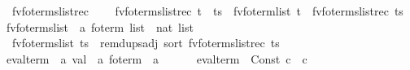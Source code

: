 \begin{isabellebody}
\ \ {\isachardoublequoteopen}fv{\isacharunderscore}{\kern0pt}fo{\isacharunderscore}{\kern0pt}terms{\isacharunderscore}{\kern0pt}list{\isacharunderscore}{\kern0pt}rec\ {\isacharbrackleft}{\kern0pt}{\isacharbrackright}{\kern0pt}\ {\isacharequal}{\kern0pt}\ {\isacharbrackleft}{\kern0pt}{\isacharbrackright}{\kern0pt}{\isachardoublequoteclose}\isanewline
{\isacharbar}{\kern0pt}\ {\isachardoublequoteopen}fv{\isacharunderscore}{\kern0pt}fo{\isacharunderscore}{\kern0pt}terms{\isacharunderscore}{\kern0pt}list{\isacharunderscore}{\kern0pt}rec\ {\isacharparenleft}{\kern0pt}t\ {\isacharhash}{\kern0pt}\ ts{\isacharparenright}{\kern0pt}\ {\isacharequal}{\kern0pt}\ fv{\isacharunderscore}{\kern0pt}fo{\isacharunderscore}{\kern0pt}term{\isacharunderscore}{\kern0pt}list\ t\ {\isacharat}{\kern0pt}\ fv{\isacharunderscore}{\kern0pt}fo{\isacharunderscore}{\kern0pt}terms{\isacharunderscore}{\kern0pt}list{\isacharunderscore}{\kern0pt}rec\ ts{\isachardoublequoteclose}\isanewline
\isanewline
{}\isamarkupfalse%
\ fv{\isacharunderscore}{\kern0pt}fo{\isacharunderscore}{\kern0pt}terms{\isacharunderscore}{\kern0pt}list\ {\isacharcolon}{\kern0pt}{\isacharcolon}{\kern0pt}\ {\isachardoublequoteopen}{\isacharparenleft}{\kern0pt}{\isacharprime}{\kern0pt}a\ fo{\isacharunderscore}{\kern0pt}term{\isacharparenright}{\kern0pt}\ list\ {\isasymRightarrow}\ nat\ list{\isachardoublequoteclose}\ \isanewline
\ \ {\isachardoublequoteopen}fv{\isacharunderscore}{\kern0pt}fo{\isacharunderscore}{\kern0pt}terms{\isacharunderscore}{\kern0pt}list\ ts\ {\isacharequal}{\kern0pt}\ remdups{\isacharunderscore}{\kern0pt}adj\ {\isacharparenleft}{\kern0pt}sort\ {\isacharparenleft}{\kern0pt}fv{\isacharunderscore}{\kern0pt}fo{\isacharunderscore}{\kern0pt}terms{\isacharunderscore}{\kern0pt}list{\isacharunderscore}{\kern0pt}rec\ ts{\isacharparenright}{\kern0pt}{\isacharparenright}{\kern0pt}{\isachardoublequoteclose}\isanewline
\isanewline
{}\isamarkupfalse%
\ eval{\isacharunderscore}{\kern0pt}term\ {\isacharcolon}{\kern0pt}{\isacharcolon}{\kern0pt}\ {\isachardoublequoteopen}{\isacharprime}{\kern0pt}a\ val\ {\isasymRightarrow}\ {\isacharprime}{\kern0pt}a\ fo{\isacharunderscore}{\kern0pt}term\ {\isasymRightarrow}\ {\isacharprime}{\kern0pt}a{\isachardoublequoteclose}\ {\isacharparenleft}{\kern0pt}\ {\isachardoublequoteopen}{\isasymcdot}{\isachardoublequoteclose}\ {}{}{\isacharparenright}{\kern0pt}\ \isanewline
\ \ {\isachardoublequoteopen}eval{\isacharunderscore}{\kern0pt}term\ {\isasymsigma}\ {\isacharparenleft}{\kern0pt}Const\ c{\isacharparenright}{\kern0pt}\ {\isacharequal}{\kern0pt}\ c{\isachardoublequoteclose}\isanewline

\end{isabellebody}
